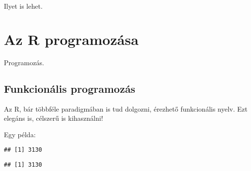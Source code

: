 \documentclass[]{book}
\newenvironment{Shaded}{\begin{snugshade}}{\end{snugshade}}
\newcommand{\KeywordTok}[1]{\textcolor[rgb]{0.13,0.29,0.53}{\textbf{#1}}}
\newcommand{\DecValTok}[1]{\textcolor[rgb]{0.00,0.00,0.81}{#1}}
\newcommand{\StringTok}[1]{\textcolor[rgb]{0.31,0.60,0.02}{#1}}
\newcommand{\ControlFlowTok}[1]{\textcolor[rgb]{0.13,0.29,0.53}{\textbf{#1}}}
\newcommand{\OperatorTok}[1]{\textcolor[rgb]{0.81,0.36,0.00}{\textbf{#1}}}
\newcommand{\NormalTok}[1]{#1}
\begin{document}
Ilyet is lehet.

\chapter{Az R programozása}\label{az-r-programozasa}

Programozás.

\section{Funkcionális programozás}\label{funkcionalis-programozas}

Az R, bár többféle paradigmában is tud dolgozni, érezhető funkcionális
nyelv. Ezt elegáns is, célszerű is kihasználni!

Egy példa:

\begin{Shaded}
\end{Shaded}

\begin{verbatim}
## [1] 3130
\end{verbatim}

\begin{Shaded}
\end{Shaded}

\begin{verbatim}
## [1] 3130
\end{verbatim}
\end{document}
